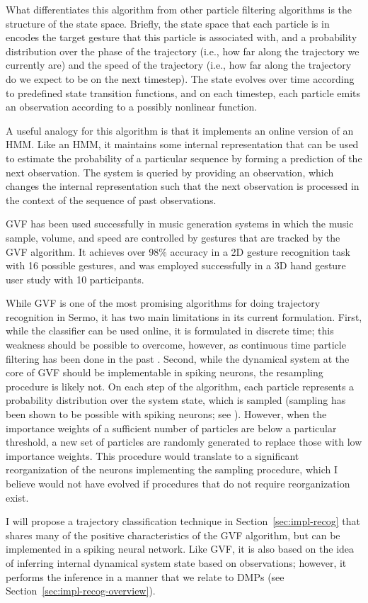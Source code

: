 What differentiates this algorithm from
other particle filtering algorithms
is the structure of the state space.
Briefly, the state space that each particle is in
encodes the target gesture that this particle
is associated with,
and a probability distribution
over the phase of the trajectory
(i.e., how far along the trajectory
we currently are)
and the speed of the trajectory
(i.e., how far along the trajectory
do we expect to be on the next timestep).
The state evolves over time according to
predefined state transition functions,
and on each timestep,
each particle emits an observation
according to a possibly nonlinear function.

A useful analogy for this algorithm
is that it implements an online version of an HMM.
Like an HMM, it maintains some internal representation
that can be used to estimate the probability
of a particular sequence
by forming a prediction
of the next observation.
The system is queried by providing
an observation,
which changes the internal representation
such that the next observation
is processed in the context of
the sequence of past observations.

GVF has been used successfully
in music generation systems
in which the music sample,
volume, and speed are
controlled by gestures
that are tracked by the GVF algorithm.
It achieves over 98\% accuracy
in a 2D gesture recognition task
with 16 possible gestures,
and was employed successfully
in a 3D hand gesture user study
with 10 participants.

While GVF is one of the most promising
algorithms for doing trajectory recognition
in Sermo,
it has two main limitations in its current formulation.
First, while the classifier can be used online,
it is formulated in discrete time;
this weakness should be possible to overcome,
however, as continuous time particle filtering
has been done in the past
\citep{ng2005}.
Second, while the dynamical system
at the core of GVF should be
implementable in spiking neurons,
the resampling procedure is likely not.
On each step of the algorithm,
each particle represents a probability
distribution over the system state,
which is sampled
(sampling has been shown to be
possible with spiking neurons;
see \citealt{buesing2011}).
However, when the importance weights
of a sufficient number of particles
are below a particular threshold,
a new set of particles
are randomly generated
to replace those with low importance weights.
This procedure would translate to
a significant reorganization
of the neurons implementing
the sampling procedure,
which I believe
would not have evolved if
procedures that do not require
reorganization exist.

I will propose a trajectory classification technique
in Section~\ref{sec:impl-recog}
that shares many of the positive
characteristics of the GVF algorithm,
but can be implemented in a spiking neural network.
Like GVF, it is also based on the idea
of inferring internal dynamical system state
based on observations;
however, it performs the inference
in a manner that we relate to
DMPs (see Section~\ref{sec:impl-recog-overview}).
